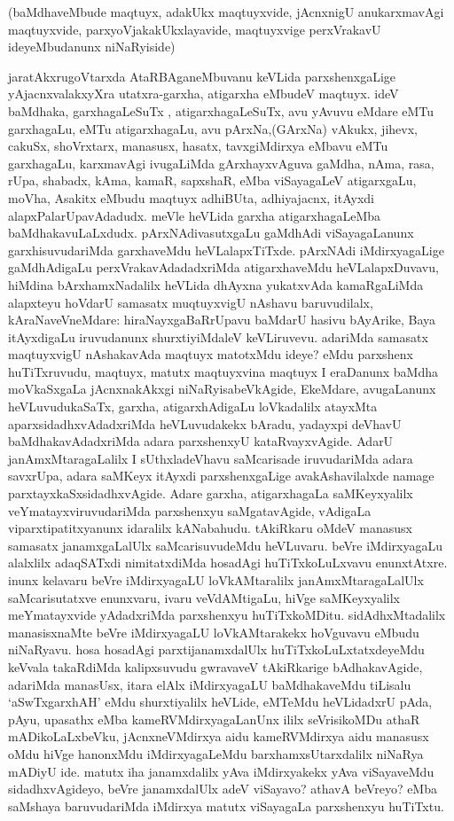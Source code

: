 

\begin{artha}
(baMdhaveMbude maqtuyx, adakUkx maqtuyxvide, jAcnxnigU anukarxmavAgi maqtuyxvide, 
parxyoVjakakUkxlayavide, maqtuyxvige perxVrakavU ideyeMbudanunx niNaRyiside)

jaratAkxrugoVtarxda AtaRBAganeMbuvanu keVLida parxshenxgaLige yAjacnxvalakxyXra utatxra-garxha, atigarxha eMbudeV maqtuyx. ideV baMdhaka, garxhagaLeSuTx , atigarxhagaLeSuTx, avu 
yAvuvu eMdare eMTu garxhagaLu, eMTu atigarxhagaLu, avu pArxNa,(GArxNa) vAkukx, jihevx, 
cakuSx, shoVrxtarx, manasusx, hasatx, tavxgiMdirxya eMbavu eMTu garxhagaLu, karxmavAgi 
ivugaLiMda gArxhayxvAguva gaMdha, nAma, rasa, rUpa, shabadx, kAma, kamaR, sapxshaR, eMba 
viSayagaLeV atigarxgaLu, moVha, Asakitx eMbudu maqtuyx adhiBUta, adhiyajacnx, itAyxdi 
alapxPalarUpavAdadudx. meVle heVLida garxha atigarxhagaLeMba baMdhakavuLaLxdudx. 
pArxNAdivasutxgaLu gaMdhAdi viSayagaLanunx garxhisuvudariMda garxhaveMdu heVLalapxTiTxde.
pArxNAdi iMdirxyagaLige gaMdhAdigaLu  perxVrakavAdadadxriMda atigarxhaveMdu 
heVLalapxDuvavu, hiMdina bArxhamxNadalilx heVLida dhAyxna yukatxvAda kamaRgaLiMda alapxteyu hoVdarU samasatx muqtuyxvigU nAshavu baruvudilalx, kAraNaveVneMdare: hiraNayxgaBaRrUpavu baMdarU hasivu bAyArike, Baya itAyxdigaLu iruvudanunx shurxtiyiMdaleV keVLiruvevu. adariMda samasatx maqtuyxvigU nAshakavAda maqtuyx matotxMdu ideye? eMdu parxshenx  huTiTxruvudu, maqtuyx, matutx maqtuyxvina maqtuyx I eraDanunx baMdha moVkaSxgaLa jAcnxnakAkxgi niNaRyisabeVkAgide, EkeMdare, avugaLanunx heVLuvudukaSaTx, garxha, atigarxhAdigaLu loVkadalilx atayxMta aparxsidadhxvAdadxriMda heVLuvudakekx bAradu, yadayxpi deVhavU baMdhakavAdadxriMda adara parxshenxyU kataRvayxvAgide. AdarU janAmxMtaragaLalilx I sUthxladeVhavu saMcarisade iruvudariMda adara savxrUpa, adara saMKeyx itAyxdi parxshenxgaLige avakAshavilalxde namage parxtayxkaSxsidadhxvAgide. Adare garxha, atigarxhagaLa saMKeyxyalilx veYmatayxviruvudariMda parxshenxyu saMgatavAgide, vAdigaLa viparxtipatitxyanunx idaralilx kANabahudu. tAkiRkaru oMdeV manasusx samasatx janamxgaLalUlx saMcarisuvudeMdu heVLuvaru. beVre iMdirxyagaLu alalxlilx adaqSATxdi nimitatxdiMda hosadAgi huTiTxkoLuLxvavu enunxtAtxre. inunx kelavaru beVre iMdirxyagaLU loVkAMtaralilx janAmxMtaragaLalUlx saMcarisutatxve enunxvaru, ivaru veVdAMtigaLu, hiVge saMKeyxyalilx meYmatayxvide yAdadxriMda parxshenxyu huTiTxkoMDitu. sidAdhxMtadalilx manasisxnaMte beVre iMdirxyagaLU loVkAMtarakekx hoVguvavu eMbudu niNaRyavu. hosa hosadAgi parxtijanamxdalUlx huTiTxkoLuLxtatxdeyeMdu keVvala takaRdiMda kalipxsuvudu gwravaveV tAkiRkarige  bAdhakavAgide, adariMda manasUsx, itara elAlx iMdirxyagaLU baMdhakaveMdu tiLisalu `aSwTxgarxhAH' eMdu shurxtiyalilx heVLide, eMTeMdu heVLidadxrU pAda, pAyu, upasathx eMba kameRVMdirxyagaLanUnx ililx seVrisikoMDu athaR mADikoLaLxbeVku, jAcnxneVMdirxya aidu kameRVMdirxya aidu manasusx oMdu hiVge hanonxMdu iMdirxyagaLeMdu barxhamxsUtarxdalilx niNaRya mADiyU ide. matutx iha janamxdalilx yAva iMdirxyakekx yAva viSayaveMdu sidadhxvAgideyo, beVre janamxdalUlx adeV viSayavo? athavA beVreyo? eMba saMshaya baruvudariMda iMdirxya matutx viSayagaLa parxshenxyu huTiTxtu.


\end{artha}
